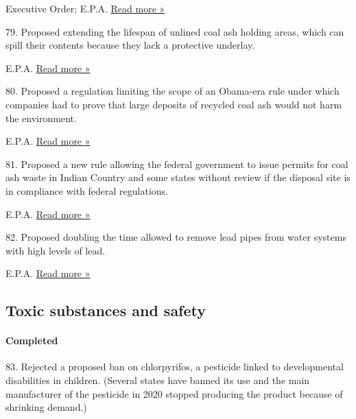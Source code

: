  Executive Order; E.P.A. \textbar{}
\href{https://news.bloomberglaw.com/environment-and-energy/white-house-begins-review-of-water-rule-easing-state-veto-power}{Read
more »}

79. Proposed extending the lifespan of unlined coal ash holding areas,
which can spill their contents because they lack a protective underlay.

 E.P.A. \textbar{}
\href{https://stateimpact.npr.org/pennsylvania/2019/11/04/trump-administration-proposes-rollbacks-for-two-obama-era-coal-pollution-rules/}{Read
more »}

80. Proposed a regulation limiting the scope of an Obama-era rule under
which companies had to prove that large deposits of recycled coal ash
would not harm the environment.

 E.P.A. \textbar{}
\href{https://www.federalregister.gov/documents/2019/08/14/2019-16916/hazardous-and-solid-waste-management-system-disposal-of-coal-combustion-residuals-from-electric\#}{Read
more »}

81. Proposed a new rule allowing the federal government to issue permits
for coal ash waste in Indian Country and some states without review if
the disposal site is in compliance with federal regulations.

 E.P.A. \textbar{}
\href{https://www.epa.gov/sites/production/files/2019-12/documents/pre_pub_version_federal_ccr_permitting_program_nprm_rin_2050-ah07_121819_514pm_for_ao_signature.pdf}{Read
more »}

82. Proposed doubling the time allowed to remove lead pipes from water
systems with high levels of lead.

 E.P.A. \textbar{}
\href{https://www.nytimes3xbfgragh.onion/2019/10/10/climate/epa-lead-water-pipes.html}{Read
more »}

\hypertarget{toxic-substances-and-safety}{%
\subsection{Toxic substances and
safety}\label{toxic-substances-and-safety}}

\hypertarget{completed-5}{%
\paragraph{Completed}\label{completed-5}}

83. Rejected a proposed ban on chlorpyrifos, a pesticide linked to
developmental disabilities in children. (Several states have banned its
use and the main manufacturer of the pesticide in 2020 stopped producing
the product because of shrinking demand.)

